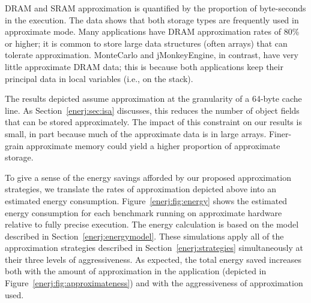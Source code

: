 DRAM and SRAM approximation is quantified by the proportion of byte-seconds in
the execution.
The data shows that
both storage types are frequently used in approximate
mode. Many applications have DRAM approximation rates
of 80\% or higher; it is common to store large data
structures (often arrays) that can tolerate approximation. MonteCarlo and
jMonkeyEngine, in contrast, have very little approximate DRAM data;
this is because both applications keep their principal data in local
variables (i.e., on the stack).

The results depicted assume approximation at the granularity of a
64-byte cache line. As Section~\ref{enerj:sec:isa} discusses, this
reduces the number of object fields that can be stored
approximately. The impact of this constraint on our
results is small, in part because much of the approximate data is
in large arrays. Finer-grain approximate memory could yield a
higher proportion of approximate storage.




To give a sense of the energy savings afforded by our proposed
approximation strategies, we translate the rates of approximation depicted
above into an estimated energy consumption. Figure~\ref{enerj:fig:energy}
shows the estimated energy consumption for each benchmark running on
approximate hardware relative to fully precise execution.
The energy calculation is based on the model
described in Section~\ref{enerj:energymodel}. These simulations apply
all of the approximation strategies described in
Section~\ref{enerj:strategies} simultaneously at their three levels of
aggressiveness. As expected, the total energy saved increases both with
the amount of approximation in the application (depicted in
Figure~\ref{enerj:fig:approximateness}) and with
the aggressiveness of approximation used.

